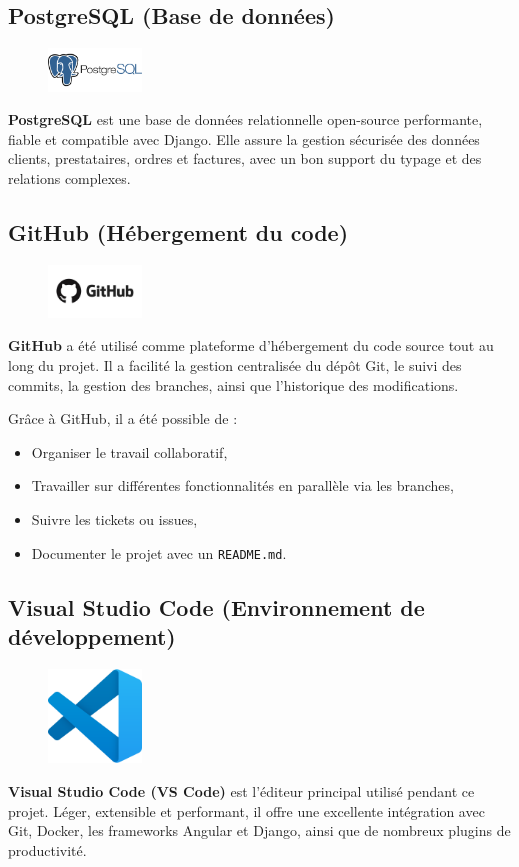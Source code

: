 \subsection*{PostgreSQL (Base de données)}
\begin{figure}[H]
\centering
\includegraphics[width=2.5cm]{figures/postgres.png}
\end{figure}
\noindent
\textbf{PostgreSQL} est une base de données relationnelle open-source performante, fiable et compatible avec Django. Elle assure la gestion sécurisée des données clients, prestataires, ordres et factures, avec un bon support du typage et des relations complexes.

\subsection*{GitHub (Hébergement du code)}
\begin{figure}[H]
\centering
\includegraphics[width=2.5cm]{figures/github.png}
\end{figure}
\noindent
\textbf{GitHub} a été utilisé comme plateforme d’hébergement du code source tout au long du projet. Il a facilité la gestion centralisée du dépôt Git, le suivi des commits, la gestion des branches, ainsi que l’historique des modifications.

Grâce à GitHub, il a été possible de :
\begin{itemize}
  \item Organiser le travail collaboratif,
  \item Travailler sur différentes fonctionnalités en parallèle via les branches,
  \item Suivre les tickets ou issues,
  \item Documenter le projet avec un \texttt{README.md}.
\end{itemize}


\subsection*{Visual Studio Code (Environnement de développement)}
\begin{figure}[H]
\centering
\includegraphics[width=2.5cm]{figures/vscode.png}
\end{figure}
\noindent
\textbf{Visual Studio Code (VS Code)} est l’éditeur principal utilisé pendant ce projet. Léger, extensible et performant, il offre une excellente intégration avec Git, Docker, les frameworks Angular et Django, ainsi que de nombreux plugins de productivité.


